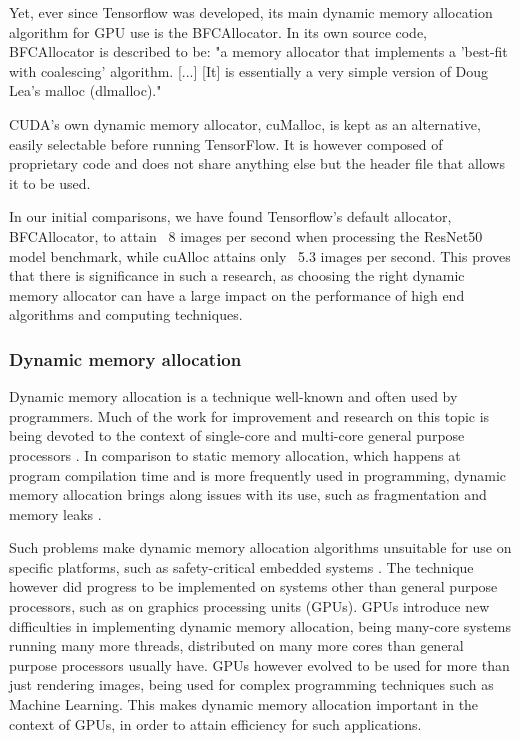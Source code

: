 \documentclass[12pt,twoside]{article}
\begin{document}
Yet, ever since Tensorflow was developed, its main dynamic memory allocation algorithm for GPU use is the BFCAllocator. In its own source code, BFCAllocator is described to be: "a memory allocator that implements a 'best-fit with coalescing' algorithm.  [...] [It] is essentially a very simple version of Doug Lea's malloc (dlmalloc)."

CUDA's own dynamic memory allocator, cuMalloc, is kept as an alternative, easily selectable before running TensorFlow. It is however composed of proprietary code and does not share anything else but the header file that allows it to be used. %

In our initial comparisons, we have found Tensorflow's default allocator, BFCAllocator, to attain ~8 images per second when processing the ResNet50 model benchmark, while cuAlloc attains only ~5.3 images per second. This proves that there is significance in such a research, as choosing the right dynamic memory allocator can have a large impact on the performance of high end algorithms and computing techniques.

\subsubsection*{Dynamic memory allocation}

Dynamic memory allocation is a technique well-known and often used by programmers. Much of the work for improvement and research on this topic is being devoted to the context of single-core and multi-core general purpose processors \cite{YOU2015}. In comparison to static memory allocation, which happens at program compilation time and is more frequently used in programming, dynamic memory allocation brings along issues with its use, such as fragmentation and memory leaks \cite{TRAISTER199099}.

Such problems make dynamic memory allocation algorithms unsuitable for use on specific platforms, such as safety-critical embedded systems \cite{Puaut_2002}. The technique however did progress to be implemented on systems other than general purpose processors, such as on graphics processing units (GPUs). GPUs introduce new difficulties in implementing dynamic memory allocation, being many-core systems running many more threads, distributed on many more cores than general purpose processors usually have. GPUs however evolved to be used for more than just rendering images, being used for complex programming techniques such as Machine Learning. This makes dynamic memory allocation important in the context of GPUs, in order to attain efficiency for such applications. %
\end{document}
